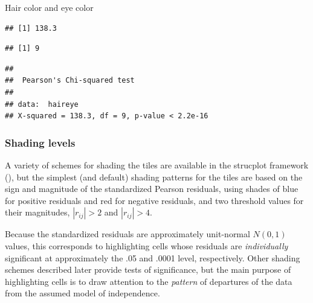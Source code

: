 \documentclass[11pt]{book}
\renewenvironment{knitrout}{\small\renewcommand{\baselinestretch}{.85}}{} %
\begin{document}
\begin{Example}[haireye2a]{Hair color and eye color}
\begin{itemize}
\begin{knitrout}
\color{fgcolor}\begin{kframe}
\begin{alltt}
 \hlkwb{<-} \hlopt{^}\hlstd{))}
\end{alltt}
\begin{verbatim}
## [1] 138.3
\end{verbatim}
\begin{alltt}
 \hlkwb{<-} \hlstd{(}\hlopt{-}\hlstd{))}
\end{alltt}
\begin{verbatim}
## [1] 9
\end{verbatim}
\begin{alltt}
\end{alltt}
\begin{verbatim}
## 
## 	Pearson's Chi-squared test
## 
## data:  haireye
## X-squared = 138.3, df = 9, p-value < 2.2e-16
\end{verbatim}
\end{kframe}
\end{knitrout}
\end{itemize}
\end{Example}

\subsubsection{Shading levels}

A variety of schemes for shading the tiles are available in the
strucplot framework (),
but the simplest (and default) shading patterns for the tiles are based on 
the sign and magnitude of the 
standardized Pearson residuals, using shades of blue for positive residuals
and red for negative residuals, and two threshold values for their magnitudes,
$|r_{ij}| > 2$ and $|r_{ij}| > 4$.

Because the standardized residuals are approximately unit-normal $N(0,1)$
values,  this corresponds to highlighting cells whose
residuals are \emph{individually} significant at approximately
the .05 and .0001 level, respectively.
Other shading schemes described later provide tests of significance,
but the main purpose  of highlighting cells is to draw attention to the \emph{pattern}
of departures of the data from the assumed model of independence.
\end{document}
